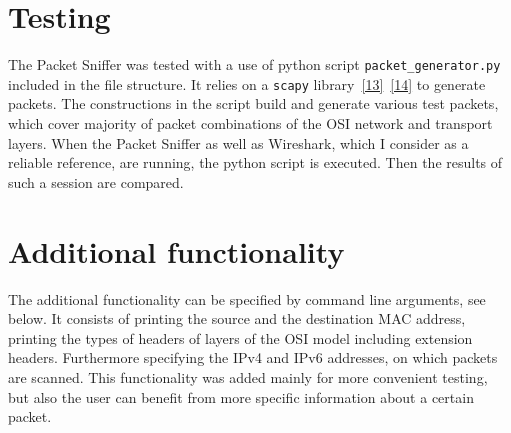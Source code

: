 \documentclass[12pt]{article}
\begin{document}
\section{Testing}
The Packet Sniffer was tested with a use of python script \texttt{packet\_generator.py} included in the file structure. It relies on a \texttt{scapy} library~\hyperref[cit13]{[13]}~\hyperref[cit14]{[14]} to generate packets. The constructions in the script build and generate various test packets, which cover majority of packet combinations of the OSI network and transport layers. When the Packet Sniffer as well as Wireshark, which I consider as a reliable reference, are running, the python script is executed. Then the results of such a session are compared.

\section{Additional functionality}
The additional functionality can be specified by command line arguments, see below. It consists of printing the source and the destination MAC address, printing the types of headers of layers of the OSI model including extension headers. Furthermore specifying the IPv4 and IPv6 addresses, on which packets are scanned. This functionality was added mainly for more convenient testing, but also the user can benefit from more specific information about a certain packet.
\end{document}
